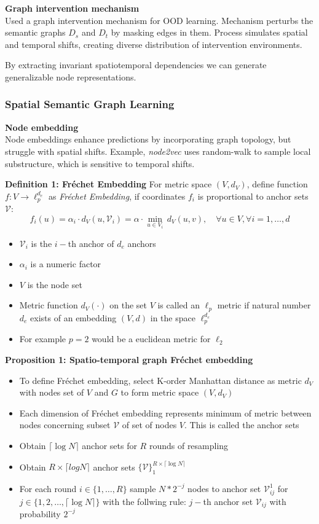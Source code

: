\documentclass[11pt]{article}
\begin{document}
\textbf{Graph intervention mechanism}\\
Used a graph intervention mechanism for OOD learning. Mechanism perturbs the semantic graphs $D_s$ and $D_t$ by masking edges in them. Process simulates spatial and temporal shifts, creating diverse distribution of intervention environments.

By extracting invariant spatiotemporal dependencies we can generate generalizable node representations.

\subsubsection{Spatial Semantic Graph Learning}

\textbf{Node embedding}\\
Node embeddings enhance predictions by incorporating graph topology, but struggle with spatial shifts. Example, \textit{node2vec} uses random-walk to sample local substructure, which is sensitive to temporal shifts.

\textbf{Definition 1: Fréchet Embedding} For metric space $(V, d_V)$, define function $f:V\rightarrow \ell_p^{d_e}$ as \textit{Fréchet Embedding}, if coordinates $f_i$ is proportional to anchor sets $\mathcal{V}$:
\[
  f_i (u)=\alpha_i\cdot d_V(u,\mathcal{V}_i)=\alpha\cdot\underset{u\in V_i}{\min}\,d_V(u,v),\quad \forall u\in V, \forall i= 1,\ldots,d
\]
\begin{itemize}
  \item $\mathcal{V}_i$ is the $i-$th anchor of $d_e$ anchors
  \item $\alpha_i$ is a numeric factor
  \item $V$ is the node set
  \item Metric function $d_V(\cdot)$ on the set $V$ is called an $\ell_p$ metric if natural number $d_e$ exists of an embedding $(V,d)$ in the space $\ell_p^{d_e}$
  \item For example $p=2$ would be a euclidean metric for $\ell_2$
\end{itemize}

\noindent\textbf{Proposition 1: Spatio-temporal graph Fréchet embedding}
\begin{itemize}
  \item To define Fréchet embedding, select K-order Manhattan distance as metric $d_V$ with nodes set of $V$ and $G$ to form metric space $(V,d_V)$
  \item Each dimension of Fréchet embedding represents minimum of metric between nodes concerning subset $\mathcal{V}$ of set of nodes $V$. This is called the anchor sets
  \item Obtain $\lceil\log N\rceil$ anchor sets for $R$ rounds of resampling
  \item Obtain $R\times\lceil log N\rceil$ anchor sets $\{\mathcal{V}\}_1^{R\times\lceil\log N\rceil}$
  \item For each round $i\in\{1,\ldots,R\}$ sample $N*2^{-j}$ nodes to anchor set $\mathcal{V}_{ij}^1$ for $j\in \{1, 2, \ldots, \lceil\log N\rceil \}$ with the follwing rule: $j-$th anchor set $\mathcal{V}_{ij}$ with probability $2^{-j}$
\end{itemize}



\end{document}
